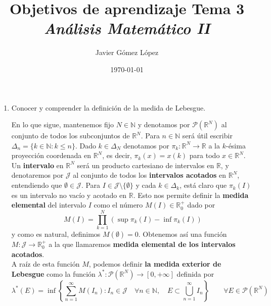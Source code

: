\documentclass[a4paper, 12pt]{article}
\title{\textbf{Objetivos de aprendizaje Tema 3} \\ \textit{Análisis Matemático II}}
\author{Javier Gómez López}
\date{\today}
\begin{document}
\maketitle

\begin{enumerate}[label=\textbf{\arabic*}.]

\item Conocer y comprender la definición de la medida de Lebesgue.

En lo que sigue, mantenemos fijo \(N \in \mathbb{N}\) y denotamos por \(\mathcal{P}(\mathbb{R}^N)\) al conjunto de todos los subconjuntos de \(\mathbb{R}^N\). Para \(n \in \mathbb{N}\) será útil escribir \(\Delta_n = \{ k \in \mathbb{N} : k \leq n\}\). Dado \(k \in \Delta_N\) denotamos por \(\pi_k : \mathbb{R}^N \to \mathbb{R}\) a la \(k\)-ésima proyección coordenada en \(\mathbb{R}^N\), es decir, \(\pi_k (x) = x(k)\) para todo \(x \in \mathbb{R}^N\). \\

Un \textbf{intervalo} en \(\mathbb{R}^N\) será un producto cartesiano de intervalos en \(\mathbb{R}\), y denotaremos por \(\mathcal{J}\) al conjunto de todos los \textbf{intervalos acotados} en \(\mathbb{R}^N\), entendiendo que \(\emptyset \in \mathcal{J}\). Para \(I \in \mathcal{J} \setminus \{\emptyset\}\) y cada \(k \in \Delta_k\), está claro que \(\pi_k(I)\) es un intervalo no vacío y acotado en \(\mathbb{R}\). Esto nos permite definir la \textbf{medida elemental} del intervalo \(I\) como el número \(M(I) \in \mathbb{R}_0^+\) dado por
\begin{equation}\label{medida_elemental}
 M(I) = \prod_{k=1}^{N} (\sup \pi_k (I) - \inf \pi_k (I))
\end{equation}
y como es natural, definimos \(M(\emptyset) = 0\). Obtenemos así una función \(M: \mathcal{J} \to \mathbb{R}_0^+\) a la que llamaremos \textbf{medida elemental de los intervalos acotados}. \\

A raíz de esta función \(M\), podemos definir \textbf{la medida exterior de Lebesgue} como la función \(\lambda^* : \mathcal{P} (\mathbb{R}^N) \to [0, + \infty]\) definida por
\begin{equation}\label{medida_exterior}
	\lambda^* (E) = \inf \left\{ \sum_{n=1}^{\infty} M(I_n) : I_n \in \mathcal{J} \quad \forall n \in \mathbb{N}, \quad E \subset \bigcup_{n=1}^{\infty} I_n \right\} \qquad \forall E \in \mathcal{P} ( \mathbb{R}^N)
\end{equation}


\end{enumerate}
\end{document}
